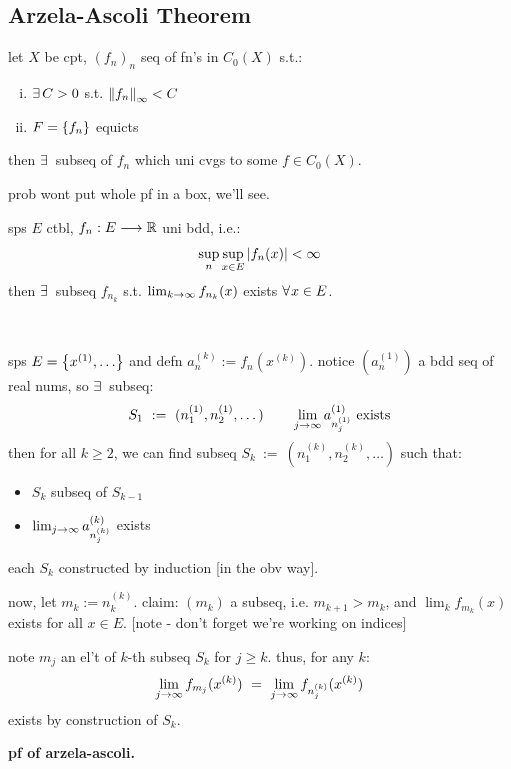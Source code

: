\subsection{Arzela-Ascoli Theorem}


\begin{thm}[title=Arzela-Ascoli]
	let $X$ be cpt, $(f_{n})_{n}$ seq of fn's in $C_{0}(X)$ s.t.:
	\begin{enumerate}[(i)]
		\item $\ex C>0$ s.t. $\left\|f_{n}\right\|_{\infty}<C$
		\item $F=\left\{{f_{n}}\right\}$ equicts
	\end{enumerate}
	then $\ex$ subseq of $f_{n}$ which uni cvgs to some $f\in C_{0}(X)$.
\end{thm}
prob wont put whole pf in a box, we'll see.

\begin{lm}
	sps $E$ ctbl, $f_{n}:E\longrightarrow\mathbb{R}$ uni bdd, i.e.:
	\begin{equation*}
		\sup_{n}\sup_{x\in E}\abs{f_{n}(x)}<\infty
	\end{equation*}
	then $\ex$ subseq $f_{n_{k}}$ s.t. $\lim_{k\rightarrow\infty}f_{n_{k}}(x)$ exists
	$\fa x\in E$.
\end{lm} \

\begin{pf}[source=Primary Source Material]
	sps $E=\left\{{x^{(1)},\dots}\right\}$ and defn $a^{(k)}_{n}:=f_{n}(x^{(k)})$.
	notice $(a_{n}^{(1)})$ a bdd seq of real nums, so $\ex$ subseq:
	\begin{equation*}
		S_{1} \ := \ (n_{1}^{(1)},n_{2}^{(1)},\dots) \qquad
		\lim_{j\sto\infty}a^{(1)}_{n_{j}^{(1)}} \trm{ exists}
	\end{equation*}
	then for all $k\geq2$, we can find subseq
	$S_{k} \ := \ (n_{1}^{(k)},n_{2}^{(k)},\dots)$ such that:
	\begin{itemize}
		\item $S_{k}$ subseq of $S_{k-1}$
		\item $\lim_{j\rightarrow\infty}a^{(k)}_{n^{(k)}_{j}}$ exists
	\end{itemize}
	each $S_{k}$ constructed by induction [in the obv way].

	now, let $m_{k}:=n_{k}^{(k)}$. claim: $(m_{k})$ a subseq, i.e. $m_{k+1}>m_{k}$,
	and $\lim_{k}f_{m_{k}}(x)$ exists for all $x\in E$.
	[note - don't forget we're working on indices]

	note $m_{j}$ an el't of $k$-th subseq $S_{k}$ for $j\geq k$. thus, for any $k$:
	\begin{equation*}
		\lim_{j\rightarrow\infty}f_{m_{j}}(x^{(k)})
		\ = \ \lim_{j\rightarrow\infty}f_{n_{j}^{(k)}}(x^{(k)})
	\end{equation*}
	exists by construction of $S_{k}$.
\end{pf}
\textbf{pf of arzela-ascoli.}

